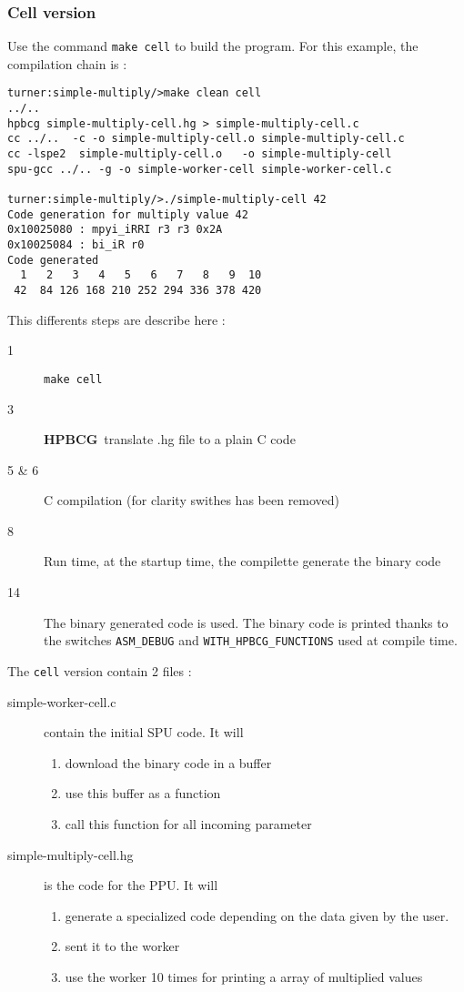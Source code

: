 \documentclass{article}
\newcommand{\hpbcg}{\textbf{HPBCG}\ }
\begin{document}
\subsubsection{Cell version}

Use the command \texttt{make cell} to build the program. For this
example, the compilation chain is :

\begin{lstlisting}
turner:simple-multiply/>make clean cell
../..
hpbcg simple-multiply-cell.hg > simple-multiply-cell.c
cc ../..  -c -o simple-multiply-cell.o simple-multiply-cell.c
cc -lspe2  simple-multiply-cell.o   -o simple-multiply-cell
spu-gcc ../.. -g -o simple-worker-cell simple-worker-cell.c 

turner:simple-multiply/>./simple-multiply-cell 42
Code generation for multiply value 42
0x10025080 : mpyi_iRRI r3 r3 0x2A 
0x10025084 : bi_iR r0 
Code generated
  1   2   3   4   5   6   7   8   9  10 
 42  84 126 168 210 252 294 336 378 420 
\end{lstlisting}

This differents steps are describe here :
\begin{description}
\item[1] \texttt{make cell}
\item[3] \hpbcg translate .hg file to a plain C code
\item[5 \& 6] C compilation (for clarity swithes has been removed)
\item[8] Run time, at the startup time, the compilette generate the
  binary code
\item[14] The binary generated code is used. The binary code is
  printed thanks to the switches \verb-ASM_DEBUG- and
  \verb-WITH_HPBCG_FUNCTIONS- used at compile time.
\end{description}

The \texttt{cell} version contain 2 files :
\begin{description}
\item[simple-worker-cell.c] contain the initial SPU code. It will
  \begin{enumerate}
  \item download the binary code in a buffer
  \item use this buffer as a function
  \item call this function for all incoming parameter
  \end{enumerate}
\item[simple-multiply-cell.hg] is the code for the PPU. It will
  \begin{enumerate}
  \item generate a specialized code depending on the data given by the user.
  \item sent it to the worker
  \item use the worker 10 times for printing a array of multiplied values
  \end{enumerate}
\end{description}
\end{document}
